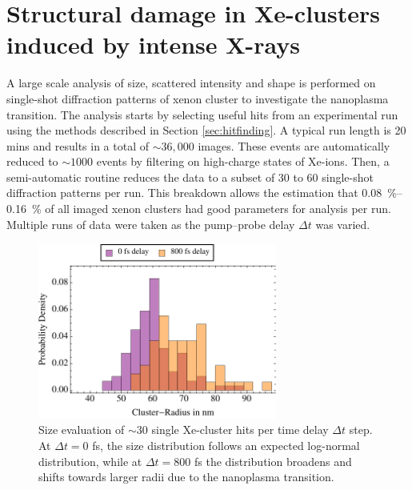 \section{Structural damage in Xe-clusters induced by intense X-rays}\label{sec:xenon-data}
A large scale analysis of size, scattered intensity and shape is performed on single-shot diffraction patterns of xenon cluster to investigate the nanoplasma transition. The analysis starts by selecting useful hits from an experimental run using the methods described in Section \ref{sec:hitfinding}. A typical run length is 20 mins and results in a total of $\sim 36,000$ images. These events are automatically reduced to $\sim 1000$ events by filtering on high-charge states of Xe-ions. Then, a semi-automatic routine reduces the data to a subset of 30 to 60 single-shot diffraction patterns per run. This breakdown allows the estimation that \SIrange{0.08}{0.16}{\percent} of all imaged xenon clusters had good parameters for analysis per run. Multiple runs of data were taken as the pump--probe delay $\Delta t$ was varied.\\[1\baselineskip]
\begin{figure}
	\centering
		\includegraphics[width=0.70\textwidth]{images/size-distributions.pdf}
	\caption[Single Xe-cluster size distribution at varying time delay $\Delta t$.]{Size evaluation of $\sim 30$ single Xe-cluster hits per time delay $\Delta t$ step. At $\Delta t=0$ fs, the size distribution follows an expected log-normal distribution, while at $\Delta t=800$ fs the distribution broadens and shifts towards larger radii due to the nanoplasma transition.}
	\label{fig:size-distributions}
\end{figure}

